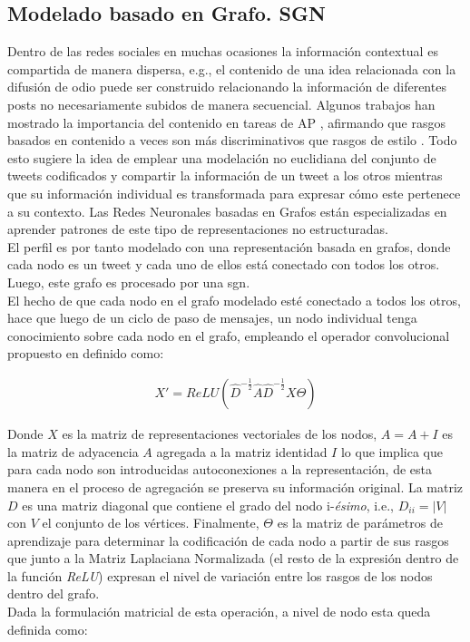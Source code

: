	\subsection{Modelado basado en Grafo. SGN}\label{sgn}
	
	Dentro de las redes sociales en muchas ocasiones la información contextual es compartida de manera dispersa, e.g., el contenido de una idea relacionada con la difusión de odio puede ser construido relacionando la información de diferentes posts no necesariamente subidos de manera secuencial. Algunos trabajos han mostrado la importancia del contenido en tareas de AP \citep{OrtegaMendoza2018EmphasizingPI}, afirmando que rasgos basados en contenido a veces son más discriminativos que rasgos de estilo \citep{reddy2016survey}. Todo esto sugiere la idea de emplear una modelación no euclidiana del conjunto de tweets codificados y compartir la información de un tweet a los otros mientras que su información individual es transformada para expresar cómo este pertenece a su contexto.
	Las Redes Neuronales basadas en Grafos están especializadas en aprender patrones de este tipo de representaciones no estructuradas.
	\\
	El perfil es por tanto modelado con una representación basada en grafos, donde cada nodo es un tweet y cada uno de ellos está conectado con todos los otros. Luego, este grafo es procesado por una \ac{sgn}.
	\\
	El hecho de que cada nodo en el grafo modelado esté conectado a todos los otros, hace que luego de un ciclo de paso de mensajes, un nodo individual tenga conocimiento sobre cada nodo en el grafo, empleando el operador convolucional propuesto en \citep{kipf2017semisupervised} definido como:
	
	\begin{align}\label{matrix-wise}
		X' = ReLU(\hat{D}^{-\frac{1}{2}}\hat{A}\hat{D}^{-\frac{1}{2}}X\Theta)
	\end{align}
	
	Donde $X$ es la matriz de representaciones vectoriales de los nodos, $\hat{A} = A + I$ es la matriz de adyacencia $A$ agregada a la matriz identidad $I$ lo que implica que para cada nodo son introducidas autoconexiones a la representación, de esta manera en el proceso de agregación se preserva su información original. La matriz $D$ es una matriz diagonal que contiene el grado del nodo i-\textit{\'{e}simo}, i.e., $D_{ii} = |V|$ con $V$ el conjunto de los vértices. Finalmente, $\Theta$ es la matriz de parámetros de aprendizaje para determinar la codificación de cada nodo a partir de sus rasgos que junto a la Matriz Laplaciana Normalizada (el resto de la expresión dentro de la función \textit{ReLU}) expresan el nivel de variación entre los rasgos de los nodos dentro del grafo.
	\\
	Dada la formulación matricial de esta operación, a nivel de nodo esta queda definida como: 
	
